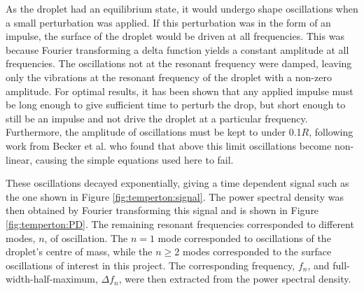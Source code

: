 \documentclass{physics_article_B}
\begin{document}
    As the droplet had an equilibrium state, it would undergo shape oscillations when a small perturbation was applied\cite{oscillate}. If this perturbation was in the form of an impulse, the surface of the droplet would be driven at all frequencies. This was because Fourier transforming a delta function yields a constant amplitude at all frequencies. The oscillations not at the resonant frequency were damped, leaving only the vibrations at the resonant frequency of the droplet with a non-zero amplitude. For optimal results, it has been shown that any applied impulse must be long enough to give sufficient time to perturb the drop, but short enough to still be an impulse and not drive the droplet at a particular frequency\cite{temperton}. Furthermore, the amplitude of oscillations must be kept to under 0.1$R$, following work from Becker et al. who found that above this limit oscillations become non-linear, causing the simple equations used here to fail\cite{becker}.
    
    These oscillations decayed exponentially, giving a time dependent signal such as the one shown in Figure \ref{fig:temperton:signal}\cite{temperton}. The power spectral density was then obtained by Fourier transforming this signal and is shown in Figure \ref{fig:temperton:PD}. The remaining resonant frequencies corresponded to different modes, $n$, of oscillation. The $n=1$ mode corresponded to oscillations of the droplet's centre of mass\cite{miller}, while the $n\geq2$ modes corresponded to the surface oscillations of interest in this project. The corresponding frequency, $f_n$, and full-width-half-maximum, $\Delta f_n$, were then extracted from the power spectral density. 
\end{document}
